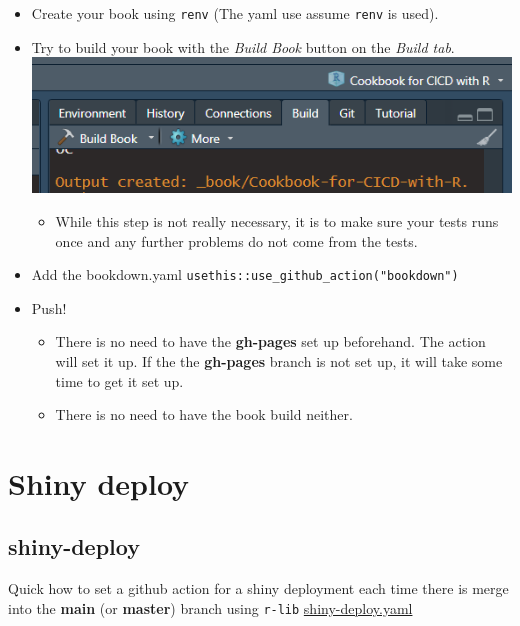 \documentclass[
]{book}
\providecommand{\tightlist}{%
  \setlength{\itemsep}{0pt}\setlength{\parskip}{0pt}}
\begin{document}
\begin{itemize}
\item
  Create your book using \texttt{renv} (The yaml use assume \texttt{renv} is used).
\item
  Try to build your book with the \emph{Build Book} button on the \emph{Build tab}. \includegraphics{images/bookdown/buildbook.png}

  \begin{itemize}
  \tightlist
  \item
    While this step is not really necessary, it is to make sure your tests runs once and any further problems do not come from the tests.
  \end{itemize}
\item
  Add the bookdown.yaml \texttt{usethis::use\_github\_action("bookdown")}
\item
  Push!

  \begin{itemize}
  \tightlist
  \item
    There is no need to have the \textbf{gh-pages} set up beforehand. The action will set it up. If the the \textbf{gh-pages} branch is not set up, it will take some time to get it set up.
  \item
    There is no need to have the book build neither.
  \end{itemize}
\end{itemize}

\hypertarget{shiny-deploy}{%
\chapter{Shiny deploy}\label{shiny-deploy}}

\hypertarget{shiny-deploy-1}{%
\section{shiny-deploy}\label{shiny-deploy-1}}

Quick how to set a github action for a shiny deployment each time there is merge into the \textbf{main} (or \textbf{master}) branch using \texttt{r-lib} \href{https://github.com/r-lib/actions/blob/v2-branch/examples/shiny-deploy.yaml}{shiny-deploy.yaml}
\end{document}
